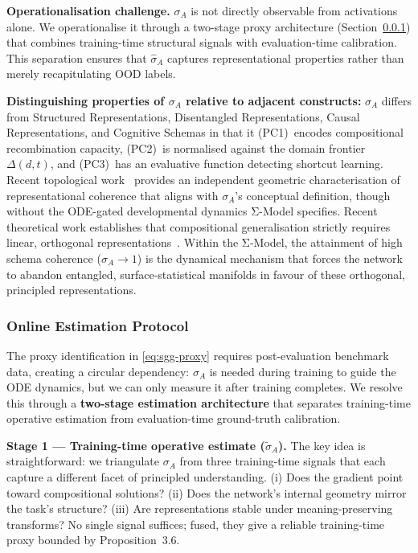 \textbf{Operationalisation challenge.} $\sigma_A$ is not directly
observable from activations alone. We operationalise it through a
two-stage proxy architecture (Section~\ref{sec:online-estimation}) that
combines training-time structural signals with evaluation-time
calibration. This separation ensures that $\hat{\sigma}_A$ captures
representational properties rather than merely recapitulating OOD labels.

\textbf{Distinguishing properties of $\sigma_A$ relative to adjacent
constructs:} $\sigma_A$ differs from Structured Representations, Disentangled
Representations, Causal Representations, and Cognitive Schemas in that it (PC1)~encodes compositional
recombination capacity, (PC2)~is normalised against the domain frontier
$\Delta(d,t)$, and (PC3)~has an evaluative function detecting shortcut learning.
Recent topological work~\cite{gaukstad2026learningcoherent} provides an
independent geometric characterisation of representational coherence that
aligns with $\sigma_A$'s conceptual definition, though without the
ODE-gated developmental dynamics Σ-Model specifies. Recent theoretical work
establishes that compositional generalisation strictly requires linear,
orthogonal representations~\cite{uselis2026linear}. Within the Σ-Model, the
attainment of high schema coherence ($\sigma_A \to 1$) is the dynamical
mechanism that forces the network to abandon entangled, surface-statistical
manifolds in favour of these orthogonal, principled representations.

\subsubsection{Online Estimation Protocol}\label{sec:online-estimation}

The proxy identification in \eqref{eq:sgg-proxy} requires
post-evaluation benchmark data, creating a circular dependency: $\sigma_A$ %
is needed during training to guide the ODE dynamics, but we can only measure it after training completes. We resolve this through a \textbf{two-stage
estimation architecture} that separates training-time operative estimation
from evaluation-time ground-truth calibration.

\textbf{Stage 1 --- Training-time operative estimate ($\tilde{\sigma}_A$).}
The key idea is straightforward: we triangulate $\sigma_A$ from three
training-time signals that each capture a different facet of principled
understanding. (i) Does the gradient point toward compositional solutions?
(ii) Does the network's internal geometry mirror the task's structure?
(iii) Are representations stable under meaning-preserving transforms?
No single signal suffices; fused, they give a reliable training-time proxy
bounded by Proposition~3.6.

